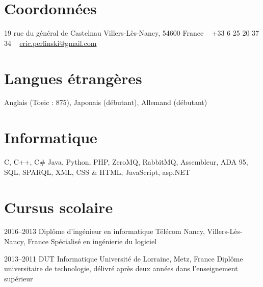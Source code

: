 \documentclass[]{cv_french} %
\begin{document}

\begin{aside} %
\section{Coordonnées}
19 rue du général de Castelnau
Villers-Lès-Nancy, 54600
France
~
+33 6 25 20 37 34
~
\href{mailto:eric.perlinski@telecomnancy.net}{eric.perlinski@gmail.com}
\section{Langues étrangères}
Anglais (Toeic : 875), 
Japonais (débutant),
Allemand (débutant)
\section{Informatique}
C, C++, C\#
Java, Python, PHP,
ZeroMQ, RabbitMQ,
Assembleur, ADA 95,
SQL, SPARQL, XML,
CSS \& HTML,
JavaScript, asp.NET
\end{aside}

\section{Cursus scolaire}

\begin{entrylist}


\entry
{2016--2013}
{Diplôme d'ingénieur en informatique}
{Télécom Nancy, Villers-Lès-Nancy, France}
{Spécialisé en ingénierie du logiciel}


\entry
{2013--2011}
{DUT Informatique}
{Université de Lorraine, Metz, France}
{Diplôme universitaire de technologie, délivré après deux années dans l'enseignement supérieur}


\end{entrylist}
\end{document}
